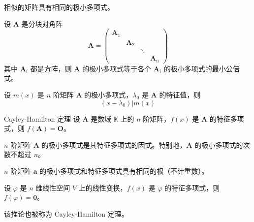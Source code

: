 \begin{proposition}
    相似的矩阵具有相同的极小多项式。
\end{proposition}

\begin{proposition}
    设 $\bm{A}$ 是分块对角阵
    \[
        \bm{A} = \begin{pmatrix}
            \bm{A}_{1} & \      & \      & \      \\
            \      & \bm{A}_{2} & \      & \      \\
            \      & \      & \ddots & \      \\
            \      & \      & \      & \bm{A}_{n}
        \end{pmatrix}
    \]
    其中 $\bm{A}_{i}$ 都是方阵，则 $\bm{A}$ 的极小多项式等于各个 $\bm{A}_{i}$ 的极小多项式的最小公倍式。
\end{proposition}

\begin{lemma}
    设 $m(x)$ 是 $n$ 阶矩阵 $\bm{A}$ 的极小多项式，$\lambda_0$ 是 $\bm{A}$ 的特征值，则
    \[
        (x - \lambda_0) | m(x)
    \]
\end{lemma}

\begin{theorem}{Cayley-Hamilton 定理}
    设 $\bm{A}$ 是数域 $\mathbb{K}$ 上的 $n$ 阶矩阵，$f(x)$ 是 $\bm{A}$ 的特征多项式，则 $f(\bm{A}) = \bm{O}$。
\end{theorem}

\begin{corollary}
    $n$ 阶矩阵 $\bm{A}$ 的极小多项式是其特征多项式的因式。特别地，$\bm{A}$ 的极小多项式的次数不超过 $n$。
\end{corollary}

\begin{corollary}
    $n$ 阶矩阵 $\bm{a}$ 的极小多项式和特征多项式具有相同的根（不计重数）。
\end{corollary}

\begin{corollary}
    设 $\varphi$ 是 $n$ 维线性空间 $V$ 上的线性变换，$f(x)$ 是 $\varphi$ 的特征多项式，则 $f(\varphi) = \bm{0}$。
\end{corollary}
\begin{remark}
    该推论也被称为 Cayley-Hamilton 定理。
\end{remark}






